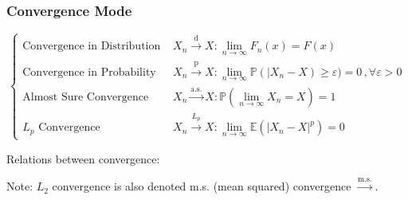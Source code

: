 \subsubsection{Convergence Mode}
    \begin{equation}
        \begin{cases}
            \text{Convergence in Distribution }&{\displaystyle X_n\xrightarrow[]{\mathrm{d}}X:\lim_{n\to\infty}F_n(x)=F(x)}\\
            \text{Convergence in Probability }&{\displaystyle X_n\xrightarrow[]{\mathrm{p}}X:\lim_{n\to\infty}\mathbb{P}(|X_n-X)\geq\varepsilon)=0\, ,\forall\varepsilon>0}\\
            \text{Almost Sure Convergence }&{\displaystyle X_n\xrightarrow[]{\text{a.s.}}X:\mathbb{P}(\lim_{n\to\infty}X_n=X)=1}\\
            L_p\text{ Convergence }&{\displaystyle X_n\xrightarrow[]{L_p}X:\lim_{n\to\infty}\mathbb{E}(|X_n-X|^p)=0}
        \end{cases}
    \end{equation}

        Relations between convergence:
        \begin{center}
        \end{center}

        Note: $ L_2 $ convergence is also denoted m.s. (mean squared) convergence $ \xrightarrow[]{\mathrm{m.s.}}  $.

